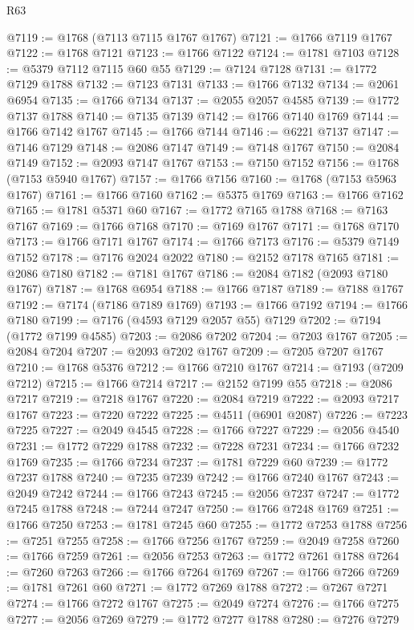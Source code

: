 \begin{lexlean}{R63}
\begin{coremodule}
@7119 := @1768 (@7113 @7115 @1767 @1767)
@7121 := @1766 @7119 @1767
@7122 := @1768 @7121
@7123 := @1766 @7122
@7124 := @1781 @7103
@7128 := @5379 @7112 @7115 @60 @55
@7129 := @7124 @7128
@7131 := @1772 @7129 @1788
@7132 := @7123 @7131
@7133 := @1766 @7132
@7134 := @2061 @6954
@7135 := @1766 @7134
@7137 := @2055 @2057 @4585
@7139 := @1772 @7137 @1788
@7140 := @7135 @7139
@7142 := @1766 @7140 @1769
@7144 := @1766 @7142 @1767
@7145 := @1766 @7144
@7146 := @6221 @7137
@7147 := @7146 @7129
@7148 := @2086 @7147
@7149 := @7148 @1767
@7150 := @2084 @7149
@7152 := @2093 @7147 @1767
@7153 := @7150 @7152
@7156 := @1768 (@7153 @5940 @1767)
@7157 := @1766 @7156
@7160 := @1768 (@7153 @5963 @1767)
@7161 := @1766 @7160
@7162 := @5375 @1769
@7163 := @1766 @7162
@7165 := @1781 @5371 @60
@7167 := @1772 @7165 @1788
@7168 := @7163 @7167
@7169 := @1766 @7168
@7170 := @7169 @1767
@7171 := @1768 @7170
@7173 := @1766 @7171 @1767
@7174 := @1766 @7173
@7176 := @5379 @7149 @7152
@7178 := @7176 @2024 @2022
@7180 := @2152 @7178 @7165
@7181 := @2086 @7180
@7182 := @7181 @1767
@7186 := @2084 @7182 (@2093 @7180 @1767)
@7187 := @1768 @6954
@7188 := @1766 @7187
@7189 := @7188 @1767
@7192 := @7174 (@7186 @7189 @1769)
@7193 := @1766 @7192
@7194 := @1766 @7180
@7199 := @7176 (@4593 @7129 @2057 @55) @7129
@7202 := @7194 (@1772 @7199 @4585)
@7203 := @2086 @7202
@7204 := @7203 @1767
@7205 := @2084 @7204
@7207 := @2093 @7202 @1767
@7209 := @7205 @7207 @1767
@7210 := @1768 @5376
@7212 := @1766 @7210 @1767
@7214 := @7193 (@7209 @7212)
@7215 := @1766 @7214
@7217 := @2152 @7199 @55
@7218 := @2086 @7217
@7219 := @7218 @1767
@7220 := @2084 @7219
@7222 := @2093 @7217 @1767
@7223 := @7220 @7222
@7225 := @4511 (@6901 @2087)
@7226 := @7223 @7225
@7227 := @2049 @4545
@7228 := @1766 @7227
@7229 := @2056 @4540
@7231 := @1772 @7229 @1788
@7232 := @7228 @7231
@7234 := @1766 @7232 @1769
@7235 := @1766 @7234
@7237 := @1781 @7229 @60
@7239 := @1772 @7237 @1788
@7240 := @7235 @7239
@7242 := @1766 @7240 @1767
@7243 := @2049 @7242
@7244 := @1766 @7243
@7245 := @2056 @7237
@7247 := @1772 @7245 @1788
@7248 := @7244 @7247
@7250 := @1766 @7248 @1769
@7251 := @1766 @7250
@7253 := @1781 @7245 @60
@7255 := @1772 @7253 @1788
@7256 := @7251 @7255
@7258 := @1766 @7256 @1767
@7259 := @2049 @7258
@7260 := @1766 @7259
@7261 := @2056 @7253
@7263 := @1772 @7261 @1788
@7264 := @7260 @7263
@7266 := @1766 @7264 @1769
@7267 := @1766 @7266
@7269 := @1781 @7261 @60
@7271 := @1772 @7269 @1788
@7272 := @7267 @7271
@7274 := @1766 @7272 @1767
@7275 := @2049 @7274
@7276 := @1766 @7275
@7277 := @2056 @7269
@7279 := @1772 @7277 @1788
@7280 := @7276 @7279

\end{coremodule}
\end{lexlean}
